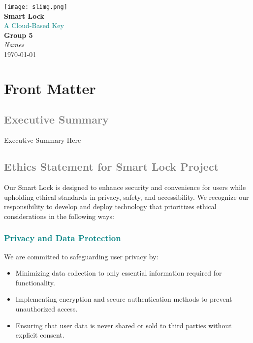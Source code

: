 \documentclass[a4paper,12pt]{report}
\begin{document}
\begin{titlepage}
    \begin{center}
        \vspace*{2cm}

        \texttt{[image: slimg.png]}\\[1cm]

        {\Huge \textbf{Smart Lock}}\\[0.5cm]
        {\textcolor{teal}{\Large A Cloud-Based Key}}\\[1.5cm]

        {\LARGE \textbf{Group 5}}\\[0.5cm]
        {\Large \textit{Names}}\\[2cm]

        {\Large \today}
    \end{center}
\end{titlepage}

\newpage
{}
\pagestyle{fancy}      

\section{Front Matter}
\subsection{\textcolor{gray}{Executive Summary}}
Executive Summary Here

\subsection{\textcolor{gray}{Ethics Statement for Smart Lock Project}}
Our Smart Lock is designed to enhance security and convenience for users while upholding ethical standards in privacy, safety, and accessibility. We recognize our responsibility to develop and deploy technology that prioritizes ethical considerations in the following ways:

\textcolor{teal}{\subsubsection{Privacy and Data Protection}}
We are committed to safeguarding user privacy by:
\begin{itemize}
    \item Minimizing data collection to only essential information required for functionality.
    \item Implementing encryption and secure authentication methods to prevent unauthorized access.
    \item Ensuring that user data is never shared or sold to third parties without explicit consent.
\end{itemize}
\end{document}
